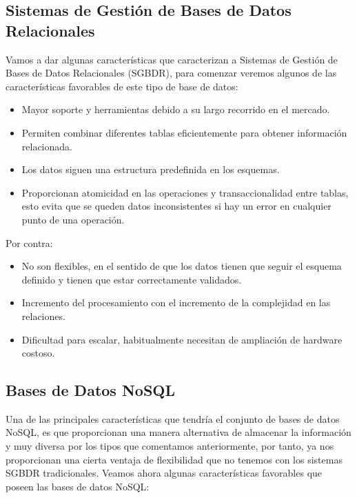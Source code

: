 \subsection{Sistemas de Gestión de Bases de Datos Relacionales}

Vamos a dar algunas características que caracterizan a Sistemas de Gestión de Bases de Datos Relacionales (SGBDR), para comenzar veremos algunos de las características favorables de este tipo de base de datos:

\begin{itemize}
    \item Mayor soporte y herramientas debido a su largo recorrido en el mercado.
    \item Permiten combinar diferentes tablas eficientemente para obtener información relacionada.
    \item Los datos siguen una estructura predefinida en los esquemas.
    \item Proporcionan atomicidad en las operaciones y transaccionalidad entre tablas, esto evita que se queden datos inconsistentes si hay un error en cualquier punto de una operación.
\end{itemize}

Por contra:

\begin{itemize}
    \item No son flexibles, en el sentido de que los datos tienen que seguir el esquema definido y tienen que estar correctamente validados.
    \item Incremento del procesamiento con el incremento de la complejidad en las relaciones.
    \item Dificultad para escalar, habitualmente necesitan de ampliación de hardware costoso.
\end{itemize}

\subsection{Bases de Datos NoSQL}

Una de las principales características que tendría el conjunto de bases de datos NoSQL, es que proporcionan una manera alternativa de almacenar la información y muy diversa por los tipos que comentamos anteriormente, por tanto, ya nos proporcionan una cierta ventaja de flexibilidad que no tenemos con los sistemas SGBDR tradicionales. Veamos ahora algunas características favorables que poseen las bases de datos NoSQL:

